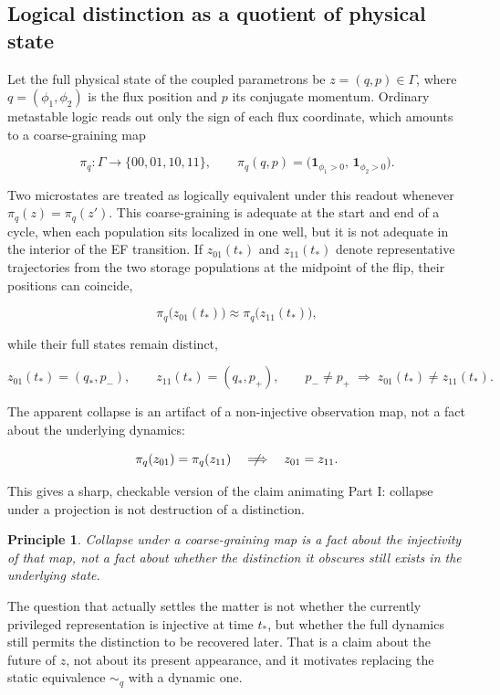\documentclass[11pt]{article}
\newtheorem{principle}{Principle}
\begin{document}
\subsection{Logical distinction as a quotient of physical state}

Let the full physical state of the coupled parametrons be $z=(q,p)\in\Gamma$, where $q=(\phi_1,\phi_2)$ is the flux position and $p$ its conjugate momentum. Ordinary metastable logic reads out only the sign of each flux coordinate, which amounts to a coarse-graining map

\[
\pi_q:\Gamma\to\{00,01,10,11\},
\qquad
\pi_q(q,p)=\bigl(\mathbf 1_{\phi_1>0},\,\mathbf 1_{\phi_2>0}\bigr).
\]

Two microstates are treated as logically equivalent under this readout whenever $\pi_q(z)=\pi_q(z')$. This coarse-graining is adequate at the start and end of a cycle, when each population sits localized in one well, but it is not adequate in the interior of the EF transition. If $z_{01}(t_\ast)$ and $z_{11}(t_\ast)$ denote representative trajectories from the two storage populations at the midpoint of the flip, their positions can coincide,

\[
\pi_q\bigl(z_{01}(t_\ast)\bigr)\approx\pi_q\bigl(z_{11}(t_\ast)\bigr),
\]

while their full states remain distinct,

\[
z_{01}(t_\ast)=(q_\ast,p_-),
\qquad
z_{11}(t_\ast)=(q_\ast,p_+),
\qquad
p_-\neq p_+
\;\Longrightarrow\;
z_{01}(t_\ast)\neq z_{11}(t_\ast).
\]

The apparent collapse is an artifact of a non-injective observation map, not a fact about the underlying dynamics:

\[
\pi_q(z_{01})=\pi_q(z_{11})
\quad\centernot\Longrightarrow\quad
z_{01}=z_{11}.
\]

This gives a sharp, checkable version of the claim animating Part I: collapse under a projection is not destruction of a distinction.

\begin{principle}
Collapse under a coarse-graining map is a fact about the injectivity of that map, not a fact about whether the distinction it obscures still exists in the underlying state.
\end{principle}

The question that actually settles the matter is not whether the currently privileged representation is injective at time $t_\ast$, but whether the full dynamics still permits the distinction to be recovered later. That is a claim about the future of $z$, not about its present appearance, and it motivates replacing the static equivalence $\sim_q$ with a dynamic one.
\end{document}
